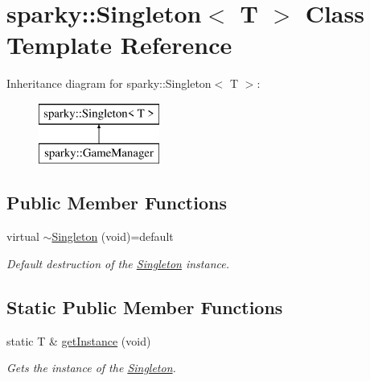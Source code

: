\hypertarget{classsparky_1_1_singleton}{}\section{sparky\+:\+:Singleton$<$ T $>$ Class Template Reference}
\label{classsparky_1_1_singleton}
Inheritance diagram for sparky\+:\+:Singleton$<$ T $>$\+:\begin{figure}[H]
\begin{center}
\leavevmode
\includegraphics[height=2.000000cm]{classsparky_1_1_singleton}
\end{center}
\end{figure}
\subsection*{Public Member Functions}
\begin{DoxyCompactItemize}
\item 
virtual \hyperlink{classsparky_1_1_singleton_aeefde4f7fc684d84734862f0e1d7ff5d}{$\sim$\+Singleton} (void)=default
\begin{DoxyCompactList}\small\item\em Default destruction of the \hyperlink{classsparky_1_1_singleton}{Singleton} instance. \end{DoxyCompactList}\end{DoxyCompactItemize}
\subsection*{Static Public Member Functions}
\begin{DoxyCompactItemize}
\item 
static T \& \hyperlink{classsparky_1_1_singleton_a8e56848cf24e5f4cdcd493c64d576f10}{get\+Instance} (void)
\begin{DoxyCompactList}\small\item\em Gets the instance of the \hyperlink{classsparky_1_1_singleton}{Singleton}. \end{DoxyCompactList}\end{DoxyCompactItemize}
